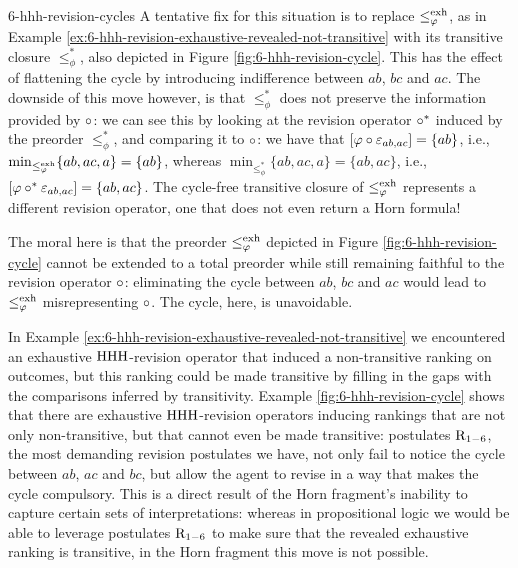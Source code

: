 \begin{xmpl}{\cite{DelgrandeP15,DelgrandePW18}}{6-hhh-revision-cycles}
	A tentative fix for this situation is to 
	replace $\le^{{\operatorname{exh}}}_{\varphi}$,
	as in Example \ref{ex:6-hhh-revision-exhaustive-revealed-not-transitive}	
	with its transitive closure $\le^{\ast}_{\phi}$,
	also depicted in Figure \ref{fig:6-hhh-revision-cycle}.
	This has the effect of flattening the cycle
	by introducing indifference between $ab$, $bc$ and $ac$.
	The downside of this move however, is that $\le^{\ast}_{\phi}$
	does not preserve the information provided by $\circ$:
	we can see this by looking at the revision operator $\circ^{\ast}$ induced 
	by the preorder $\le^{\ast}_{\phi}$, 
	and comparing it to $\circ$: 
	we have that
	$[\varphi\circ\varepsilon_{ab,ac}]=\{ab\}$,
	i.e.,
	${\operatorname{min}}_{\le^{{\operatorname{exh}}}_{\varphi}}\{ab,ac,a\} = \{ab\}$,
	whereas 
	$\min_{\le^{\ast}_{\phi}}\{ab,ac,a\} = \{ab,ac\}$,
	i.e., 
	$[\varphi\circ^{\ast}\varepsilon_{ab,ac}]=\{ab,ac\}$.
	The cycle-free transitive closure of $\le^{{\operatorname{exh}}}_{\varphi}$
	represents a different revision operator, 
	one that does not even return a Horn formula!

	The moral here is that 
	the preorder $\le^{{\operatorname{exh}}}_{\varphi}$
	depicted in Figure \ref{fig:6-hhh-revision-cycle}
	cannot be extended to a total preorder while
	still remaining faithful to the revision operator $\circ$:
	eliminating the cycle between $ab$, $bc$ and $ac$
	would lead to $\le^{{\operatorname{exh}}}_{\varphi}$ misrepresenting $\circ$.
	The cycle, here, is unavoidable.
\end{xmpl}

In Example \ref{ex:6-hhh-revision-exhaustive-revealed-not-transitive}
we encountered an exhaustive ${\mathrm{HHH}}$-revision operator 
that induced a non-transitive ranking on outcomes,
but this ranking could be made transitive by 
filling in the gaps with the
comparisons inferred by transitivity.
Example \ref{fig:6-hhh-revision-cycle}
shows that there are exhaustive ${\mathrm{HHH}}$-revision operators 
inducing rankings that are not only non-transitive,
but that cannot even be made transitive:
postulates $\mathrm{R}_{1-6}$,
the most demanding revision postulates we have,
not only fail to notice the cycle between $ab$, $ac$ and $bc$,
but allow the agent to revise in a way that makes the cycle
compulsory.
This is a direct result of the Horn fragment's inability
to capture certain sets of interpretations:
whereas in propositional logic we would be able 
to leverage postulates $\mathrm{R}_{1-6}$
to make sure that the revealed exhaustive ranking is transitive,
in the Horn fragment this move is not possible.


